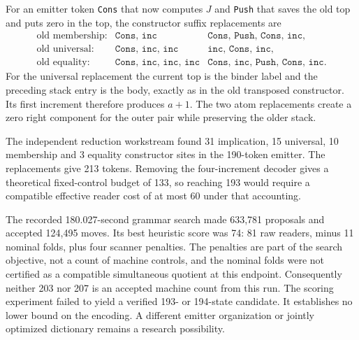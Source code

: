 For an emitter token \texttt{Cons} that now computes $J$ and
\texttt{Push} that saves the old top and puts zero in the top, the
constructor suffix replacements are
\[
\begin{array}{lll}
 \text{old membership:}&\texttt{Cons, inc}&
       \texttt{Cons, Push, Cons, inc},\\
 \text{old universal:}&\texttt{Cons, inc, inc}&
       \texttt{inc, Cons, inc},\\
 \text{old equality:}&\texttt{Cons, inc, inc, inc}&
       \texttt{Cons, inc, Push, Cons, inc}.
\end{array}
\]
For the universal replacement the current top is the binder label and
the preceding stack entry is the body, exactly as in the old transposed
constructor.  Its first increment therefore produces $a+1$.
The two atom replacements create a zero right component for the outer
pair while preserving the older stack.

The independent reduction workstream found 31 implication, 15 universal,
10 membership and 3 equality constructor sites in the 190-token emitter.
The replacements give 213 tokens.  Removing the four-increment decoder
gives a theoretical fixed-control budget of 133, so reaching 193 would
require a compatible effective reader cost of at most 60 under that
accounting.

The recorded 180.027-second grammar search made 633,781 proposals and
accepted 124,495 moves.  Its best heuristic score was 74: 81 raw readers,
minus 11 nominal folds, plus four scanner penalties.  The penalties are
part of the search objective, not a count of machine controls, and the
nominal folds were not certified as a compatible simultaneous quotient
at this endpoint.  Consequently neither 203 nor 207 is an accepted
machine count from this run.  The scoring experiment failed to yield
a verified 193- or 194-state candidate.  It establishes no lower bound
on the encoding.  A different emitter organization or jointly optimized
dictionary remains a research possibility.

